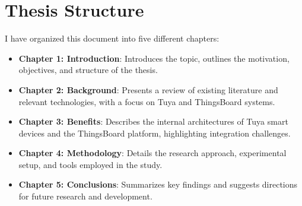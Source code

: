 \section{Thesis Structure}

\noindent I have organized this document into five different chapters:

\begin{itemize}
	\item \textbf{Chapter 1: Introduction}: Introduces the topic, outlines the motivation, objectives, and structure of the thesis.
	\item \textbf{Chapter 2: Background}: Presents a review of existing literature and relevant technologies, with a focus on Tuya and ThingsBoard systems.
	\item \textbf{Chapter 3: Benefits}: Describes the internal architectures of Tuya smart devices and the ThingsBoard platform, highlighting integration challenges.
	\item \textbf{Chapter 4: Methodology}: Details the research approach, experimental setup, and tools employed in the study.
	\item \textbf{Chapter 5: Conclusions}: Summarizes key findings and suggests directions for future research and development.
\end{itemize}
